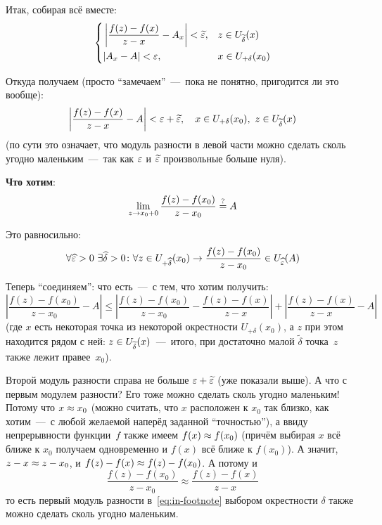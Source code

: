\documentclass[a4paper,12pt]{article}
\begin{document}
\begin{remark}
{      Итак, собирая всё вместе:
      \[
        \left\{
          \begin{aligned}
            &\left|\frac{f(z) - f(x)}{z - x} - A_x\right| < \widetilde {\varepsilon}, & &z \in U_{\widetilde \delta}(x)\\
            &|A_x - A| < \varepsilon, & &x \in U_{+\delta}(x_0)
          \end{aligned}
        \right.
      \]

      Откуда получаем (просто ``замечаем''~---~пока не понятно, пригодится ли это вообще):
      \[
        \left|\frac{f(z) - f(x)}{z - x} - A\right| < \eps + \widetilde\eps,\quad x \in U_{+\delta}(x_0),\ z \in U_{\widetilde \delta}(x)
      \]
      (по сути это означает, что модуль разности в левой части можно сделать сколь угодно маленьким~---~так как $\varepsilon$ и $\widetilde{\varepsilon}$ произвольные больше нуля).

      \textbf{Что хотим}:
      \[
        \lim_{z \to x_0 + 0} \frac{f(z) - f(x_0)}{z - x_0} \overset{\operatorname{?}}{=} A
      \]

      Это равносильно:
      \[
        \forall \widehat{\varepsilon} > 0\ \exists \widehat\delta > 0\colon \forall z \in U_{+{\widehat\delta}}(x_0) \to \frac{f(z) - f(x_0)}{z - x_0} \in U_{\widehat{\varepsilon}}(A)
      \]

      Теперь ``соединяем'': что есть~---~с тем, что хотим получить:
      \begin{equation}\label{eq:in-footnote}   
        \left|\frac{f(z) - f(x_0)}{z - x_0} - A\right|
          \leq \left|\frac{f(z) - f(x_0)}{z - x_0} - \frac{f(z) - f(x)}{z - x}\right| + \left|\frac{f(z) - f(x)}{z - x} - A\right|
      \end{equation}
      (где $x$ есть некоторая точка из некоторой окрестности $U_{+\delta}(x_0)$, а $z$ при этом находится рядом с ней: $z \hm\in U_{\widetilde\delta}(x)$~---~итого, при достаточно малой $\widetilde\delta$ точка~$z$ также лежит правее~$x_0$).

      Второй модуль разности справа не больше $\eps \hm+ \widetilde\eps$ (уже показали выше).
      А что с первым модулем разности?
      Его тоже можно сделать сколь угодно маленьким!
      Потому что $x \hm\approx x_0$ (можно считать, что $x$ расположен к $x_0$ так близко, как хотим~---~с любой желаемой наперёд заданной ``точностью''), а ввиду непрерывности функции~$f$ также имеем $f(x) \hm\approx f(x_0)$ (причём выбирая $x$ всё ближе к $x_0$ получаем одновременно и $f(x)$ всё ближе к $f(x_0)$).
      А значит, $z \hm- x \hm\approx z \hm- x_0$, и $f(z) \hm- f(x) \hm\approx f(z) \hm- f(x_0)$.
      А потому и
      \[
        \frac{f(z) - f(x_0)}{z - x_0} \approx \frac{f(z) - f(x)}{z - x}
      \]
      то есть первый модуль разности в~\eqref{eq:in-footnote} выбором окрестности $\delta$ также можно сделать сколь угодно маленьким.

}
\end{remark}
\end{document}
